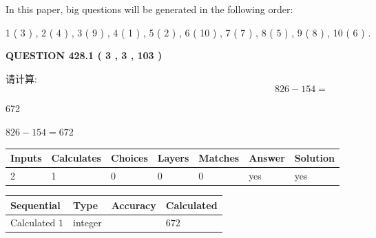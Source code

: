\documentclass{ctexart}
\begin{document}
In this paper, big questions will be generated in the following order: 
   
   
   1 ( 3 )
 ,
   2 ( 4 )
 ,
   3 ( 9 )
 ,
   4 ( 1 )
 ,
   5 ( 2 )
 ,
   6 ( 10 )
 ,
   7 ( 7 )
 ,
   8 ( 5 )
 ,
   9 ( 8 )
 ,
   10 ( 6 )
 .
  
\vspace{0.2in}
  
{\textbf{\Large{QUESTION
428.1 
 ( 3 , 3 , 103 )
}}}
  
  
 
请计算:
\begin{equation}
826 -   %
154 = \nonumber
\end{equation}
 
 
 
\noindent{}
 
 

672
 
 
\noindent{}
 
 

 
 
 
\noindent{}
 
 

$ %
826 -  %
154=   %
672$
 
 
\noindent{}
 
 

 
   
   
   
   
\noindent\begin{tabular}{|l|l|l|l|l|l|l|}
 \hline
Inputs & Calculates & Choices & Layers & Matches & Answer & Solution \\ \hline
 2  & 
 1  & 
 0
  & 
 0  & 
 0  & 
  yes & 
  yes 
  \\ \hline
 \end{tabular}
   
   
   
   
\noindent{}
   
   
  
  
\noindent\begin{tabular}{|l|l|l|l|}
\hline
 Sequential & Type & Accuracy & Calculated \\ 
\hline
 
 
  Calculated $  1 $ & integer &  & 
  $ 672 $ 
 \\  \hline  
 \end{tabular}
   
\end{document}
